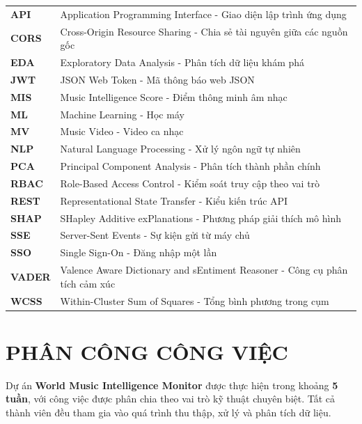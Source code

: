 \documentclass[12pt,a4paper]{report}
\begin{document}
\begin{tabularx}{\textwidth}{lX}
\textbf{API} & Application Programming Interface - Giao diện lập trình ứng dụng \\
\textbf{CORS} & Cross-Origin Resource Sharing - Chia sẻ tài nguyên giữa các nguồn gốc \\
\textbf{EDA} & Exploratory Data Analysis - Phân tích dữ liệu khám phá \\
\textbf{JWT} & JSON Web Token - Mã thông báo web JSON \\
\textbf{MIS} & Music Intelligence Score - Điểm thông minh âm nhạc \\
\textbf{ML} & Machine Learning - Học máy \\
\textbf{MV} & Music Video - Video ca nhạc \\
\textbf{NLP} & Natural Language Processing - Xử lý ngôn ngữ tự nhiên \\
\textbf{PCA} & Principal Component Analysis - Phân tích thành phần chính \\
\textbf{RBAC} & Role-Based Access Control - Kiểm soát truy cập theo vai trò \\
\textbf{REST} & Representational State Transfer - Kiểu kiến trúc API \\
\textbf{SHAP} & SHapley Additive exPlanations - Phương pháp giải thích mô hình \\
\textbf{SSE} & Server-Sent Events - Sự kiện gửi từ máy chủ \\
\textbf{SSO} & Single Sign-On - Đăng nhập một lần \\
\textbf{VADER} & Valence Aware Dictionary and sEntiment Reasoner - Công cụ phân tích cảm xúc \\
\textbf{WCSS} & Within-Cluster Sum of Squares - Tổng bình phương trong cụm \\
\end{tabularx}
\clearpage

\chapter{PHÂN CÔNG CÔNG VIỆC}

Dự án \textbf{World Music Intelligence Monitor} được thực hiện trong khoảng \textbf{5 tuần}, với công việc được phân chia theo vai trò kỹ thuật chuyên biệt. Tất cả thành viên đều tham gia vào quá trình thu thập, xử lý và phân tích dữ liệu.
\end{document}
